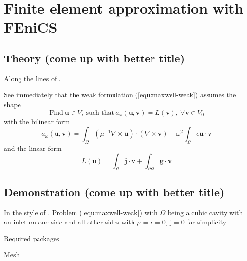 \documentclass[11pt, a4paper]{article}
\begin{document}


\pagebreak
\section{Finite element approximation with FEniCS}
\label{sec:fem}

\subsection{Theory (come up with better title)}
\label{subsec:fem-theory}


Along the lines of \cite{fenics}.

See immediately that the weak formulation (\ref{equ:maxwell-weak}) assumes the shape
\begin{equation}
    \text{Find}~\mathbf{u} \in V,~\text{such that}~a_{\omega}(\mathbf{u}, \mathbf{v}) = L(\mathbf{v}), ~\forall \mathbf{v} \in V_0
\end{equation}
with the bilinear form 
\begin{equation}
    a_{\omega}(\mathbf{u}, \mathbf{v}) = \int_{\Omega} (\mu^{-1} \nabla \times \mathbf{u}) \cdot (\nabla \times \mathbf{v})
    - \omega^2 \int_{\Omega} \epsilon \mathbf{u} \cdot \mathbf{v}
\end{equation}
and the linear form 
\begin{equation}
    L(\mathbf{u}) = \int_{\Omega} \mathbf{j} \cdot \mathbf{v} + \int_{\partial \Omega} \mathbf{g} \cdot \mathbf{v}
\end{equation}


\subsection{Demonstration (come up with better title)}
\label{subsec:fem-demo}

In the style of \cite{fenics}. 
Problem (\ref{equ:maxwell-weak}) with $\Omega$ being a cubic cavity with an inlet
on one side and all other sides with $\mu = \epsilon = 0$, $\mathbf{j} = 0$
for simplicity.

Required packages


Mesh

\end{document}
